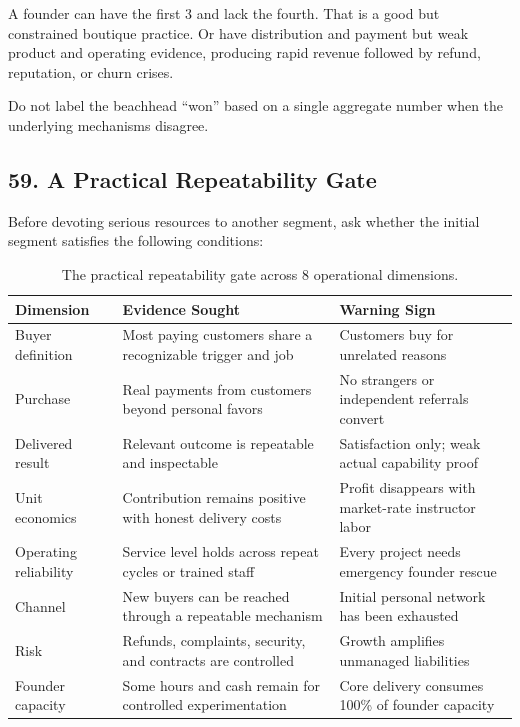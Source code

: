 A founder can have the first 3 and lack the fourth. That is a good but constrained boutique practice. Or have distribution and payment but weak product and operating evidence, producing rapid revenue followed by refund, reputation, or churn crises.

Do not label the beachhead ``won'' based on a single aggregate number when the underlying mechanisms disagree.

\subsection*{59. A Practical Repeatability Gate}

Before devoting serious resources to another segment, ask whether the initial segment satisfies the following conditions:

\begin{table}[t]
\centering
\small
\begin{tabularx}{\textwidth}{l p{7cm} X}
\toprule
\textbf{Dimension} & \textbf{Evidence Sought} & \textbf{Warning Sign} \\
\midrule
Buyer definition & Most paying customers share a recognizable trigger and job & Customers buy for unrelated reasons \\
Purchase & Real payments from customers beyond personal favors & No strangers or independent referrals convert \\
Delivered result & Relevant outcome is repeatable and inspectable & Satisfaction only; weak actual capability proof \\
Unit economics & Contribution remains positive with honest delivery costs & Profit disappears with market-rate instructor labor \\
Operating reliability & Service level holds across repeat cycles or trained staff & Every project needs emergency founder rescue \\
Channel & New buyers can be reached through a repeatable mechanism & Initial personal network has been exhausted \\
Risk & Refunds, complaints, security, and contracts are controlled & Growth amplifies unmanaged liabilities \\
Founder capacity & Some hours and cash remain for controlled experimentation & Core delivery consumes 100\% of founder capacity \\
\bottomrule
\end{tabularx}
\caption{The practical repeatability gate across 8 operational dimensions.}
\label{tab:ch7-repeatability-gate}
\end{table}

